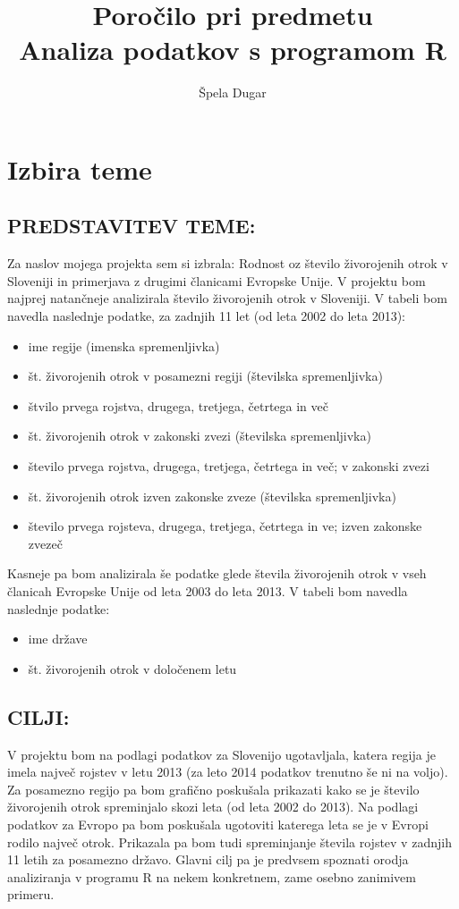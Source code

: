 \documentclass[11pt,a4paper]{article}
\begin{document}
\title{Poročilo pri predmetu \\
Analiza podatkov s programom R}
\author{Špela Dugar}
\maketitle

\section{Izbira teme}

\subsection{PREDSTAVITEV TEME:}
Za naslov mojega projekta sem si izbrala: Rodnost oz število živorojenih otrok v Sloveniji in primerjava z drugimi članicami Evropske Unije.
V projektu bom najprej natančneje analizirala število živorojenih otrok v Sloveniji. V tabeli bom navedla naslednje podatke, za zadnjih 11 let (od leta 2002 do leta 2013):
\begin{itemize}
\item{ime regije (imenska spremenljivka)}
\item{št. živorojenih otrok v posamezni regiji (številska spremenljivka)}
\item{štvilo prvega rojstva, drugega, tretjega, četrtega in več}
\item{št. živorojenih otrok v zakonski zvezi (številska spremenljivka)}
\item{število prvega rojstva, drugega, tretjega, četrtega in več; v zakonski zvezi}
\item{št. živorojenih otrok izven zakonske zveze (številska spremenljivka)}
\item{število prvega rojsteva, drugega, tretjega, četrtega in ve; izven zakonske zvezeč}
\end{itemize}
Kasneje pa bom analizirala še podatke glede števila živorojenih otrok v vseh članicah Evropske Unije od leta 2003 do leta 2013. V tabeli bom navedla naslednje podatke:
\begin{itemize}
\item{ime države}
\item{št. živorojenih otrok v določenem letu}
\end{itemize}

 

\subsection{CILJI:}
V projektu bom na podlagi podatkov za Slovenijo ugotavljala, katera regija je imela največ rojstev v letu 2013 (za leto 2014 podatkov trenutno še ni na voljo). Za posamezno regijo pa bom grafično poskušala prikazati kako se je število živorojenih otrok spreminjalo skozi leta (od leta 2002 do 2013).
Na podlagi podatkov za Evropo pa bom poskušala ugotoviti katerega leta se je v Evropi rodilo največ otrok. Prikazala pa bom tudi spreminjanje števila rojstev v zadnjih 11 letih za posamezno državo.
Glavni cilj pa je predvsem spoznati orodja analiziranja v programu R na nekem konkretnem, zame osebno zanimivem primeru.
\end{document}
